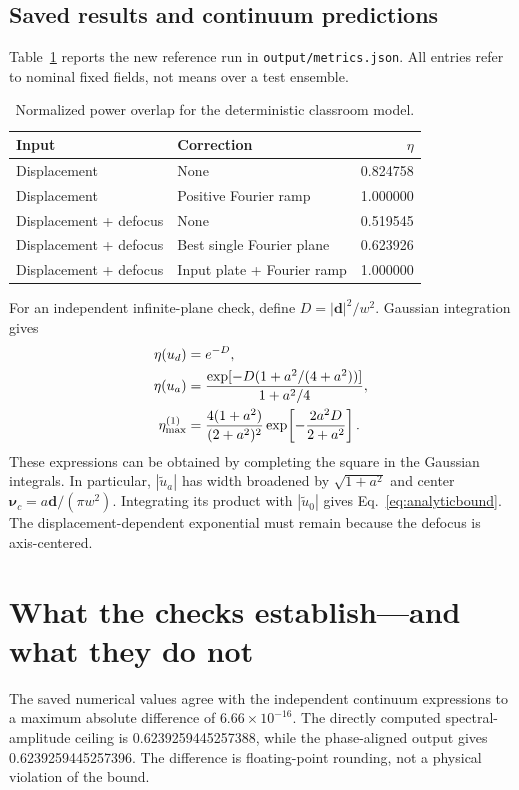 \documentclass[10pt,a4paper]{article}
\newcommand{\dvec}{\mathbf d}
\newcommand{\fvec}{\boldsymbol\nu}
\begin{document}
\subsection{Saved results and continuum predictions}
Table~\ref{tab:results} reports the new reference run in \texttt{output/metrics.json}. All entries refer to nominal fixed fields, not means over a test ensemble.
\begin{table}[H]
\centering
\caption{Normalized power overlap for the deterministic classroom model.}
\label{tab:results}
\begin{tabular}{llr}
\toprule
Input & Correction & $\eta$ \\
\midrule
Displacement & None & 0.824758 \\
Displacement & Positive Fourier ramp & 1.000000 \\
Displacement + defocus & None & 0.519545 \\
Displacement + defocus & Best single Fourier plane & 0.623926 \\
Displacement + defocus & Input plate + Fourier ramp & 1.000000 \\
\bottomrule
\end{tabular}
\end{table}
For an independent infinite-plane check, define $D=|\dvec|^2/w^2$. Gaussian integration gives
\begin{align}
 \eta(u_d)&=e^{-D},\\
 \eta(u_a)&=\frac{\exp[-D(1+a^2/(4+a^2))]}{1+a^2/4},\\
 \eta_{\rm max}^{(1)}&=\frac{4(1+a^2)}{(2+a^2)^2}
 \exp\!\left[-\frac{2a^2D}{2+a^2}\right].\label{eq:analyticbound}
\end{align}
These expressions can be obtained by completing the square in the Gaussian integrals. In particular, $|\widetilde u_a|$ has width broadened by $\sqrt{1+a^2}$ and center $\fvec_c=a\dvec/(\pi w^2)$. Integrating its product with $|\widetilde u_0|$ gives Eq.~\eqref{eq:analyticbound}. The displacement-dependent exponential must remain because the defocus is axis-centered.

\newpage
\section{What the checks establish---and what they do not}
The saved numerical values agree with the independent continuum expressions to a maximum absolute difference of $6.66\times10^{-16}$. The directly computed spectral-amplitude ceiling is 0.6239259445257388, while the phase-aligned output gives 0.6239259445257396. The difference is floating-point rounding, not a physical violation of the bound.
\end{document}
